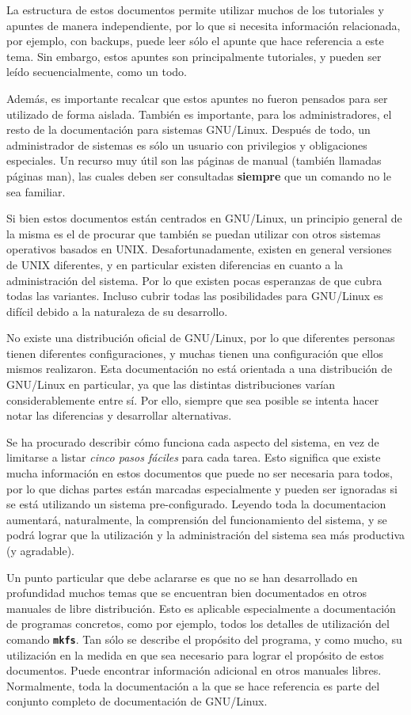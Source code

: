 \documentclass[12pt]{article}
\begin{document}
La estructura de estos documentos permite utilizar muchos de los tutoriales y apuntes
de manera independiente, por lo que si necesita información relacionada, por ejemplo,
con backups, 
puede leer sólo el apunte que hace referencia a este tema. 
Sin embargo, estos apuntes son principalmente tutoriales,
y pueden ser leído secuencialmente, como un todo.

Además, es importante recalcar que estos apuntes no fueron
pensados para ser utilizado de forma aislada. También
es importante, para los administradores, el resto de la documentación
para sistemas GNU/Linux. Después de todo, un administrador de sistemas es sólo
un usuario con privilegios y obligaciones especiales. Un recurso muy útil son
las páginas de manual (también llamadas páginas man), las cuales deben ser
consultadas \textbf{siempre} que un comando no le sea familiar.  

Si bien estos documentos están centrados en GNU/Linux, un principio general de la
misma es el de procurar que también se puedan utilizar con otros sistemas
operativos basados en UNIX. Desafortunadamente, existen en
general versiones de UNIX diferentes, y en
particular existen diferencias en cuanto a la administración del sistema. 
Por lo que existen pocas esperanzas de que
cubra todas las variantes. Incluso cubrir todas las posibilidades para GNU/Linux
es difícil debido a la naturaleza de su desarrollo.  

No existe una distribución oficial de GNU/Linux, por lo que diferentes
personas tienen diferentes configuraciones, y muchas tienen una configuración
que ellos mismos realizaron. Esta documentación no está orientada a una distribución de
GNU/Linux en particular, ya que las distintas distribuciones varían
considerablemente entre sí. Por ello, siempre que sea posible se intenta hacer
notar las diferencias y desarrollar alternativas.

Se ha procurado describir cómo funciona cada aspecto del sistema, en vez
de limitarse a listar \textit{cinco pasos fáciles} para cada tarea. Esto significa que
existe
mucha información en estos documentos que puede no ser necesaria para todos, por lo
que dichas partes están marcadas especialmente y pueden ser
ignoradas si se está utilizando un sistema pre-configurado. Leyendo toda la documentacion
aumentará, naturalmente, la comprensión del funcionamiento del sistema, y se
podrá lograr que la utilización y la administración del sistema sea más
productiva (y agradable).

Un punto particular que debe aclararse es que no se han desarrollado en
profundidad muchos temas que se encuentran bien documentados en otros manuales
de libre distribución. Esto es aplicable especialmente a documentación de
programas concretos, como por ejemplo, todos los detalles de utilización del
comando \texttt{\textbf{mkfs}}. Tan sólo se describe el propósito del programa,
y como mucho, su utilización en la medida en que sea necesario para lograr el
propósito de estos documentos. Puede encontrar información adicional en otros
manuales libres. Normalmente, toda la documentación a la que se hace referencia
es parte del conjunto completo de documentación de GNU/Linux.  
\end{document}
